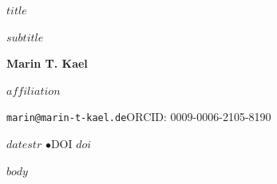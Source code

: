 \documentclass[11pt]{article}
\begin{document}
\begin{center}
{\LARGE\bfseries $title$\par}
\vspace{4pt}
{\large $subtitle$\par}
\vspace{14pt}
{\large\bfseries Marin T. Kael\par}
\vspace{2pt}
$affiliation$\par
\texttt{marin@marin-t-kael.de}\quad ORCID: 0009-0006-2105-8190\par
\vspace{12pt}
{\large $datestr$ \quad$\bullet$\quad DOI \href{https://doi.org/$doi$}{$doi$}\par}
\end{center}
\vspace{6pt}
\begin{abstract}
$abstract$
\end{abstract}
\clearpage
$body$
\end{document}
